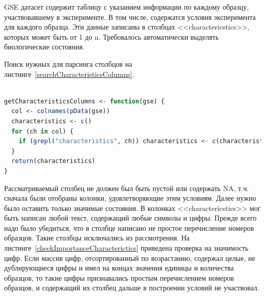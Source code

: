 \documentclass[times,specification,annotation]{itmo-student-thesis}
\begin{document}
GSE датасет содержит таблицу с указанием информации по каждому образцу, участвовавшему в эксперименте. В том числе, содержатся условия эксперимента для каждого образца. Эти данные записаны в столбцах <<charactericstics>>, которых может быть от 1 до n. Требовалось автоматически выделять биологические состояния.  

Поиск нужных для парсинга столбцов на листинге~\ref{searchCharacteristicsColumns}. 

\begin{lstlisting}[float=!h, caption={Поиск столбцов <<charactericstics>>.}, captionpos=b, label={searchCharacteristicsColumns}, basicstyle=\footnotesize, language=R]

getCharacteristicsColumns <- function(gse) {
  col <- colnames(pData(gse))
  characteristics <- c()
  for (ch in col) {
    if (grepl("characteristics", ch)) characteristics <- c(characteristics, ch)
  }
  return(characteristics)
}

\end{lstlisting}

Рассматриваемый столбец не должен был быть пустой или содержать NA, т.ч. сначала были отобраны колонки, удовлетворяющие этим условиям. Далее нужно было оставить только значимые состояния. В колонках <<charactericstics>> мог быть написан любой текст, содержащий любые символы и цифры. Прежде всего надо было убедиться, что в столбце написано не простое перечисление номеров образцов. Такие столбцы исключались из рассмотрения. На листинге~\ref{checkImportanceCharacterictics} приведена проверка на значимость цифр. Если массив цифр, отсортированный по возрастанию, содержал целые, не дублирующиеся цифры и имел на концах значения единицы и количества образцов, то такие цифры признавались простым перечислением номеров образцов, и содержащий их столбец дальше в построении условий не участвовал.    
\end{document}

